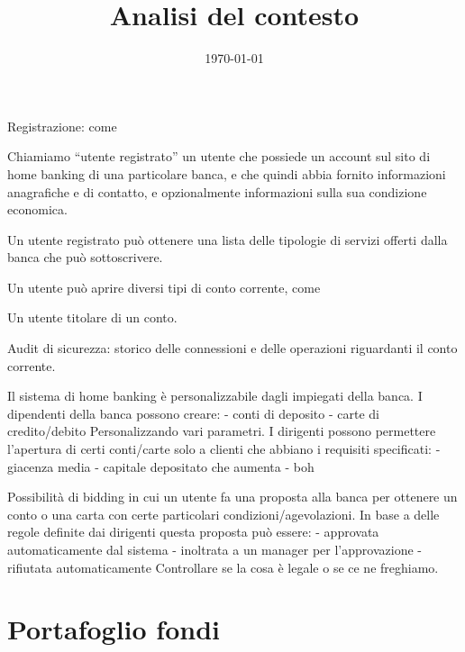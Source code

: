 \documentclass[]{softeng}
\title{Analisi del contesto}
\date{\today}
\begin{document}
\maketitle

Registrazione: come

Chiamiamo ``utente registrato'' un utente che possiede un account sul sito di home banking di una particolare banca, e che quindi abbia fornito informazioni anagrafiche e di contatto, e opzionalmente informazioni sulla sua condizione economica.

Un utente registrato pu\`o ottenere una lista delle tipologie di servizi offerti dalla banca che pu\`o sottoscrivere.

Un utente pu\`o aprire diversi tipi di conto corrente, come 

Un utente titolare di un conto.

Audit di sicurezza:
storico delle connessioni e delle operazioni riguardanti il conto corrente.

Il sistema di home banking \`e personalizzabile dagli impiegati della banca.
I dipendenti della banca possono creare:
- conti di deposito
- carte di credito/debito
Personalizzando vari parametri.
I dirigenti possono permettere l'apertura di certi conti/carte solo a clienti che abbiano i requisiti specificati:
- giacenza media
- capitale depositato che aumenta
- boh

Possibilit\`a di bidding in cui un utente fa una proposta alla banca per ottenere un conto o una carta con certe particolari condizioni/agevolazioni.
In base a delle regole definite dai dirigenti questa proposta pu\`o essere:
- approvata automaticamente dal sistema
- inoltrata a un manager per l'approvazione
- rifiutata automaticamente
Controllare se la cosa \`e legale o se ce ne freghiamo.

\section{Portafoglio fondi}
\end{document}
